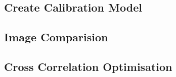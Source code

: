 \subsection{Create Calibration Model}
 \label{code:2.2}

\subsection{Image Comparision}
 \label{code:2.3}

\subsection{Cross Correlation Optimisation}
 \label{code:2.4}
